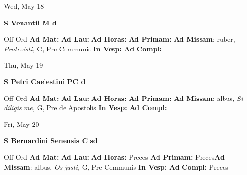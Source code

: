\documentclass[10pt]{memoir}
\begin{document}
\begin{center}
\begin{minipage}{3.5in}
\vspace{2em}
\begin{center}Wed, May 18
\end{center}
\textbf{ \large S Venantii M
\textnormal{\normalsize d}}

\begin{justify}Off Ord
\textbf{Ad Mat: }
\textbf{Ad Lau: }
\textbf{Ad Horas: }
\textbf{Ad Primam: }\textbf{Ad Missam}: ruber, \textit{Protexisti,} G, Pre Communis
\textbf{In Vesp: }
\textbf{Ad Compl: }
\end{justify}
\end{minipage}
\end{center}

\begin{center}
\begin{minipage}{3.5in}
\vspace{2em}
\begin{center}Thu, May 19
\end{center}
\textbf{ \large S Petri Caelestini PC
\textnormal{\normalsize d}}

\begin{justify}Off Ord
\textbf{Ad Mat: }
\textbf{Ad Lau: }
\textbf{Ad Horas: }
\textbf{Ad Primam: }\textbf{Ad Missam}: albus, \textit{Si diligis me,} G, Pre de Apostolis
\textbf{In Vesp: }
\textbf{Ad Compl: }
\end{justify}
\end{minipage}
\end{center}

\begin{center}
\begin{minipage}{3.5in}
\vspace{2em}
\begin{center}Fri, May 20
\end{center}
\textbf{ \large S Bernardini Senensis C
\textnormal{\normalsize sd}}

\begin{justify}Off Ord
\textbf{Ad Mat: }
\textbf{Ad Lau: }
\textbf{Ad Horas: }Preces
\textbf{Ad Primam: }Preces\textbf{Ad Missam}: albus, \textit{Os justi,} G, Pre Communis
\textbf{In Vesp: }
\textbf{Ad Compl: }Preces
\end{justify}
\end{minipage}
\end{center}
\end{document}
